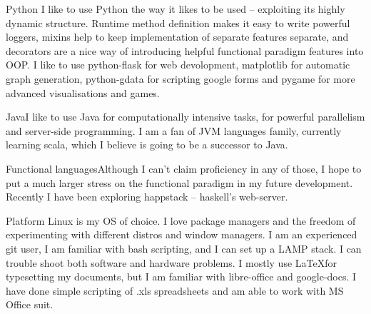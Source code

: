 \documentclass{tccv}
\begin{document}
\begin{skillist}

\item{Python}
     {I like to use Python the way it likes to be used -- exploiting its highly dynamic structure. Runtime method definition makes it easy to write powerful loggers, mixins help to keep implementation of separate features separate, and decorators are a nice way of introducing helpful functional paradigm features into OOP. I like to use python-flask for web devolopment, matplotlib for automatic graph generation, python-gdata for scripting google forms and pygame for more advanced visualisations and games.}
\item{Java}{I like to use Java for computationally intensive tasks, for powerful parallelism and server-side programming. I am a fan of JVM languages family, currently learning scala, which I believe is going to be a successor to Java.}
\item{Functional languages}{Although I can't claim proficiency in any of those, I hope to put a much larger stress on the functional paradigm in my future development. Recently I have been exploring happstack -- haskell's web-server.}
\item{Platform}
     {Linux is my OS of choice. I love package managers and the freedom of experimenting with different distros and window managers. I am an experienced git user, I am familiar with bash scripting, and I can set up a LAMP stack. I can trouble shoot both software and hardware problems. I mostly use \LaTeX  for typesetting my documents, but I am familiar with libre-office and google-docs. I have done simple scripting of .xls spreadsheets and am able to work with MS Office suit.}
\end{skillist}
\end{document}
